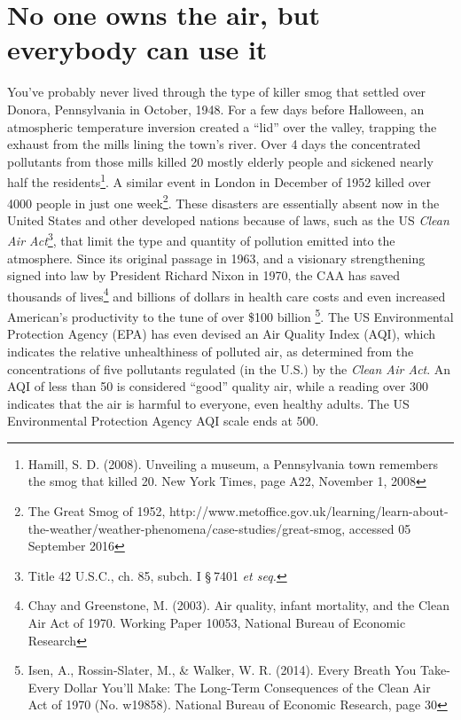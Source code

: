\documentclass[amstex,12pt]{book}
\begin{document}
\section{No one owns the air, but everybody can use it} \label{Air is a common property}
You've probably never lived through the type of killer smog that settled over Donora, Pennsylvania in October, 1948. For a few days before Halloween, an atmospheric temperature inversion created a ``lid'' over the valley, trapping the exhaust from the mills lining the town's river. Over 4 days the concentrated pollutants from those mills killed 20 mostly elderly people and sickened nearly half the residents\footnote{Hamill, S. D. (2008). Unveiling a museum, a Pennsylvania town remembers the smog that killed 20. New York Times, page A22, November 1, 2008}. A similar event in London in December of 1952 killed over 4000 people in just one week\footnote{The Great Smog of 1952, http://www.metoffice.gov.uk/learning/learn-about-the-weather/weather-phenomena/case-studies/great-smog, accessed 05 September 2016}. These disasters are essentially absent now in the United States and other developed nations because of laws, such as the US \emph{Clean Air Act}\footnote{Title 42 U.S.C., ch. 85, subch. I \S 7401 \textit{et seq.}}, that limit the type and quantity of pollution emitted into the atmosphere. Since its original passage in 1963, and a visionary strengthening signed into law by President Richard Nixon in 1970, the CAA has saved thousands of lives\footnote{Chay and Greenstone, M. (2003). Air quality, infant mortality, and the Clean Air Act of 1970. Working Paper 10053, National Bureau of Economic Research} and billions of dollars in health care costs and even increased American's productivity to the tune of over \$100 billion \footnote{Isen, A., Rossin-Slater, M., \& Walker, W. R. (2014). Every Breath You Take-Every Dollar You'll Make: The Long-Term Consequences of the Clean Air Act of 1970 (No. w19858). National Bureau of Economic Research, page 30}. The US Environmental Protection Agency (EPA) has even devised an Air Quality Index (AQI), which indicates the relative unhealthiness of polluted air, as determined from the concentrations of five pollutants regulated (in the U.S.) by the \emph{Clean Air Act}. An AQI of less than 50 is considered ``good'' quality air, while a reading over 300 indicates that the air is harmful to everyone, even healthy adults. The US Environmental Protection Agency AQI scale ends at 500.
\end{document}
